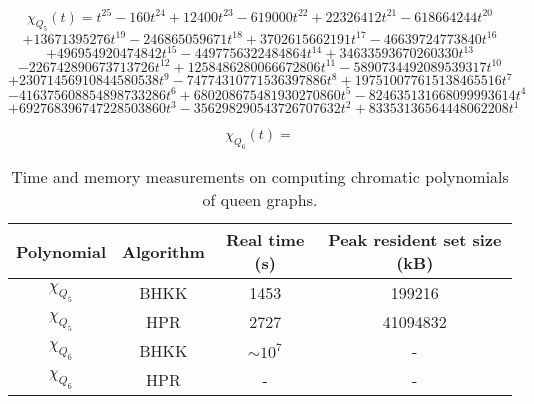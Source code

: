 \documentclass[a4paper]{article}
\begin{document}
\[
 \chi_{Q_5}(t) = 
 t^{25} -160t^{24} + 12400t^{23} -619000t^{22} + 22326412t^{21} -618664244t^{20}
 \]
 \[
 + 13671395276t^{19} -246865059671t^{18} + 3702615662191t^{17} -46639724773840t^{16}
 \]\[
 + 496954920474842t^{15} -4497756322484864t^{14} + 34633593670260330t^{13}
 \]\[
 -226742890673713726t^{12} + 1258486280066672806t^{11} -5890734492089539317t^{10}
 \]\[
 + 23071456910844580538t^9 -74774310771536397886t^8 + 197510077615138465516t^7
 \]\[
 -416375608854898733286t^6 + 680208675481930270860t^5 -824635131668099993614t^4
 \]\[
 + 692768396747228503860t^3 -356298290543726707632t^2 + 83353136564448062208t^1
\]

\[
 \chi_{Q_6}(t) = 
\]

\begin{table}[H]\centering
\begin{tabular}{|c|c|c|c|} \hline
  Polynomial & Algorithm & Real time (s) & Peak resident set size (kB) \\ \hline
  $\chi_{Q_5}$ & BHKK & 1453 & 199216 \\ \hline
  $\chi_{Q_5}$ & HPR & 2727 & 41094832 \\ \hline
  $\chi_{Q_6}$ & BHKK & $\sim 10^{7}$ & - \\ \hline
  $\chi_{Q_6}$ & HPR & - & - \\ \hline
\end{tabular}
\caption{Time and memory measurements on computing chromatic polynomials of queen graphs.}
\end{table}
\end{document}
